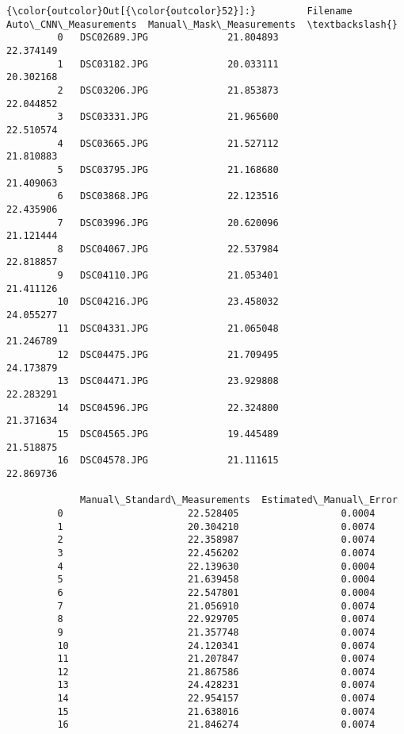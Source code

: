 \documentclass[11pt]{article}
\begin{document}
\begin{Verbatim}[commandchars=\\\{\}]
{\color{outcolor}Out[{\color{outcolor}52}]:}         Filename  Auto\_CNN\_Measurements  Manual\_Mask\_Measurements  \textbackslash{}
         0   DSC02689.JPG              21.804893                 22.374149   
         1   DSC03182.JPG              20.033111                 20.302168   
         2   DSC03206.JPG              21.853873                 22.044852   
         3   DSC03331.JPG              21.965600                 22.510574   
         4   DSC03665.JPG              21.527112                 21.810883   
         5   DSC03795.JPG              21.168680                 21.409063   
         6   DSC03868.JPG              22.123516                 22.435906   
         7   DSC03996.JPG              20.620096                 21.121444   
         8   DSC04067.JPG              22.537984                 22.818857   
         9   DSC04110.JPG              21.053401                 21.411126   
         10  DSC04216.JPG              23.458032                 24.055277   
         11  DSC04331.JPG              21.065048                 21.246789   
         12  DSC04475.JPG              21.709495                 24.173879   
         13  DSC04471.JPG              23.929808                 22.283291   
         14  DSC04596.JPG              22.324800                 21.371634   
         15  DSC04565.JPG              19.445489                 21.518875   
         16  DSC04578.JPG              21.111615                 22.869736   
         
             Manual\_Standard\_Measurements  Estimated\_Manual\_Error  
         0                      22.528405                  0.0004  
         1                      20.304210                  0.0074  
         2                      22.358987                  0.0074  
         3                      22.456202                  0.0074  
         4                      22.139630                  0.0004  
         5                      21.639458                  0.0004  
         6                      22.547801                  0.0004  
         7                      21.056910                  0.0074  
         8                      22.929705                  0.0074  
         9                      21.357748                  0.0074  
         10                     24.120341                  0.0074  
         11                     21.207847                  0.0074  
         12                     21.867586                  0.0074  
         13                     24.428231                  0.0074  
         14                     22.954157                  0.0074  
         15                     21.638016                  0.0074  
         16                     21.846274                  0.0074  
\end{Verbatim}
            
\end{document}
